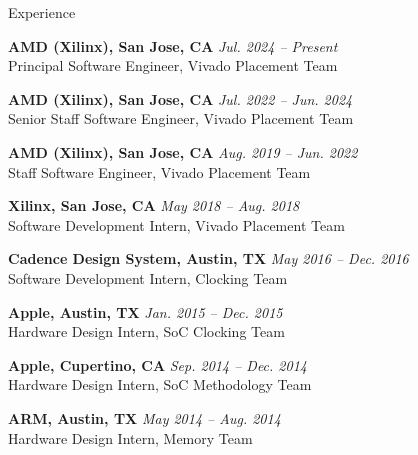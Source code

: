 \begin{rSection}{Experience}


{\bf AMD (Xilinx), San Jose, CA} \hfill {\em Jul. 2024 -- Present} \\
Principal Software Engineer, Vivado Placement Team

{\bf AMD (Xilinx), San Jose, CA} \hfill {\em Jul. 2022 -- Jun. 2024} \\
Senior Staff Software Engineer, Vivado Placement Team

{\bf AMD (Xilinx), San Jose, CA} \hfill {\em Aug. 2019 -- Jun. 2022} \\
Staff Software Engineer, Vivado Placement Team

{\bf Xilinx, San Jose, CA} \hfill {\em May 2018 -- Aug. 2018} \\
Software Development Intern, Vivado Placement Team
    
{\bf Cadence Design System, Austin, TX} \hfill {\em May 2016 -- Dec. 2016} \\
Software Development Intern, Clocking Team

{\bf Apple, Austin, TX} \hfill {\em Jan. 2015 -- Dec. 2015} \\
Hardware Design Intern, SoC Clocking Team

{\bf Apple, Cupertino, CA} \hfill {\em Sep. 2014 -- Dec. 2014} \\
Hardware Design Intern, SoC Methodology Team

{\bf ARM, Austin, TX} \hfill {\em May 2014 -- Aug. 2014} \\
Hardware Design Intern, Memory Team


\end{rSection}

